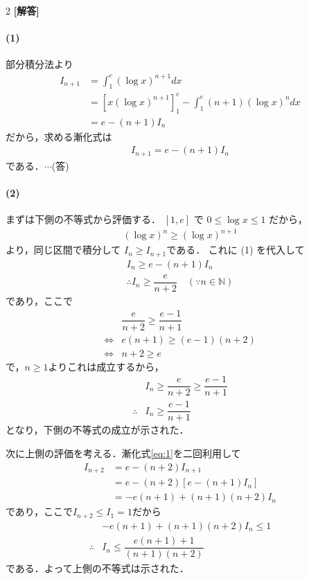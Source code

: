 \documentclass[../../main.tex]{subfiles}
\begin{document}
\setcounter{equation}{0}
\begin{oframed}
  
\end{oframed}
\setlength{\columnseprule}{0.4pt}
\begin{multicols}{2}
  {\bf [解答]}
  \paragraph{(1)}
  部分積分法より
  \begin{align}
    I_{n+1}
    & = \int_{1}^{e} (\log x)^{n+1} dx                                             \\
    & = \left[ x(\log x)^{n+1} \right]_{1}^{e} - \int_{1}^{e} (n+1)(\log x)^{n} dx \\
    & = e - (n+1)I_n
  \end{align}
  だから，求める漸化式は
  \begin{align}
    I_{n+1} =  e - (n+1)I_n \label{eq:1}
  \end{align}
  である．$\cdots$(答)

  \paragraph{(2)}
  まずは下側の不等式から評価する．
  $[1,e]$ で $0 \le \log x \le 1$ だから，
  \begin{align}
    (\log x)^n \ge (\log x)^{n+1}
  \end{align}
  より，同じ区間で積分して $I_n \ge I_{n+1}$である．
  これに (1) を代入して
  \begin{align}
    I_n \ge e - (n+1)I_n \\
    \therefore I_n \ge \dfrac{e}{n+2} \quad (\because n \in \mathbb{N})
  \end{align}
  であり，ここで
  \begin{align}
    & \dfrac{e}{n+2} \ge \dfrac{e-1}{n+1} \\
    \iff & e(n+1) \ge (e-1)(n+2)             \\
    \iff & n+2     \ge e
  \end{align}
  で，$n\ge 1$よりこれは成立するから，
  \begin{align}
    & I_n \ge \dfrac{e}{n+2} \ge \dfrac{e-1}{n+1} \\
    \therefore
    & I_n \ge \dfrac{e-1}{n+1}
  \end{align}
  となり，下側の不等式の成立が示された．

  次に上側の評価を考える．漸化式\cref{eq:1}を二回利用して
  \begin{align}
    I_{n+2}
    & =  e - (n+2)I_{n+1}                 \\
    & =  e - (n+2)\left[e-(n+1)I_n\right] \\
    & =  -e(n+1) + (n+1)(n+2)I_n
  \end{align}
  であり，ここで$I_{n+2}\le I_{1} =1$だから
  \begin{align}
    & -e(n+1) + (n+1)(n+2)I_n \le 1       \\
    \therefore
    & I_n \le \dfrac{e(n+1)+1}{(n+1)(n+2)}
  \end{align}
  である．よって上側の不等式は示された．


\end{multicols}
\end{document}
